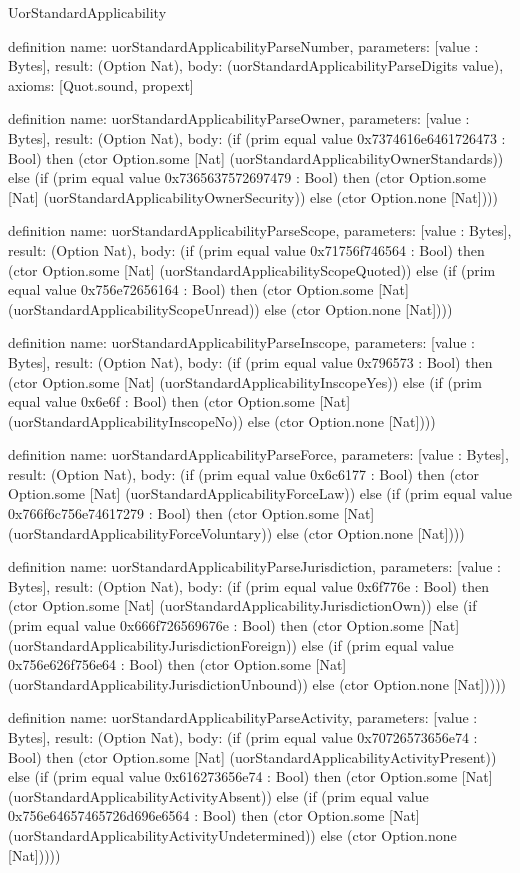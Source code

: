 \begin{lexlean}{UorStandardApplicability}
\begin{semanticmodule}
definition{
  name: uorStandardApplicabilityParseNumber,
  parameters: [value : Bytes],
  result: (Option Nat),
  body: (uorStandardApplicabilityParseDigits value),
  axioms: [Quot.sound, propext]
}

definition{
  name: uorStandardApplicabilityParseOwner,
  parameters: [value : Bytes],
  result: (Option Nat),
  body: (if (prim equal value 0x7374616e6461726473 : Bool) then (ctor Option.some [Nat] (uorStandardApplicabilityOwnerStandards)) else (if (prim equal value 0x7365637572697479 : Bool) then (ctor Option.some [Nat] (uorStandardApplicabilityOwnerSecurity)) else (ctor Option.none [Nat])))
}

definition{
  name: uorStandardApplicabilityParseScope,
  parameters: [value : Bytes],
  result: (Option Nat),
  body: (if (prim equal value 0x71756f746564 : Bool) then (ctor Option.some [Nat] (uorStandardApplicabilityScopeQuoted)) else (if (prim equal value 0x756e72656164 : Bool) then (ctor Option.some [Nat] (uorStandardApplicabilityScopeUnread)) else (ctor Option.none [Nat])))
}

definition{
  name: uorStandardApplicabilityParseInscope,
  parameters: [value : Bytes],
  result: (Option Nat),
  body: (if (prim equal value 0x796573 : Bool) then (ctor Option.some [Nat] (uorStandardApplicabilityInscopeYes)) else (if (prim equal value 0x6e6f : Bool) then (ctor Option.some [Nat] (uorStandardApplicabilityInscopeNo)) else (ctor Option.none [Nat])))
}

definition{
  name: uorStandardApplicabilityParseForce,
  parameters: [value : Bytes],
  result: (Option Nat),
  body: (if (prim equal value 0x6c6177 : Bool) then (ctor Option.some [Nat] (uorStandardApplicabilityForceLaw)) else (if (prim equal value 0x766f6c756e74617279 : Bool) then (ctor Option.some [Nat] (uorStandardApplicabilityForceVoluntary)) else (ctor Option.none [Nat])))
}

definition{
  name: uorStandardApplicabilityParseJurisdiction,
  parameters: [value : Bytes],
  result: (Option Nat),
  body: (if (prim equal value 0x6f776e : Bool) then (ctor Option.some [Nat] (uorStandardApplicabilityJurisdictionOwn)) else (if (prim equal value 0x666f726569676e : Bool) then (ctor Option.some [Nat] (uorStandardApplicabilityJurisdictionForeign)) else (if (prim equal value 0x756e626f756e64 : Bool) then (ctor Option.some [Nat] (uorStandardApplicabilityJurisdictionUnbound)) else (ctor Option.none [Nat]))))
}

definition{
  name: uorStandardApplicabilityParseActivity,
  parameters: [value : Bytes],
  result: (Option Nat),
  body: (if (prim equal value 0x70726573656e74 : Bool) then (ctor Option.some [Nat] (uorStandardApplicabilityActivityPresent)) else (if (prim equal value 0x616273656e74 : Bool) then (ctor Option.some [Nat] (uorStandardApplicabilityActivityAbsent)) else (if (prim equal value 0x756e64657465726d696e6564 : Bool) then (ctor Option.some [Nat] (uorStandardApplicabilityActivityUndetermined)) else (ctor Option.none [Nat]))))
}


\end{semanticmodule}
\end{lexlean}
